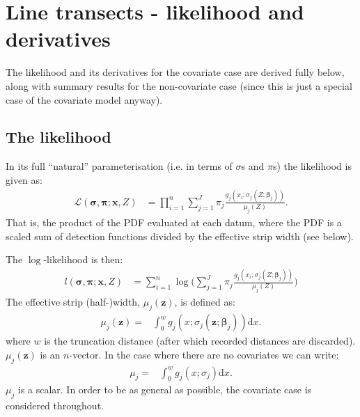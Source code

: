 \label{app-mixderivs}

\newcommand{\erf}{\text{Erf}}
\newcommand{\palphaj}{\frac{\partial}{\partial \alpha_{j*}}}
\newcommand{\pbetajk}{\frac{\partial}{\partial \beta_{j*k*}}}
\newcommand{\nuj}{\nu_j(\bm{z}^{(j)})}
\newcommand{\nujs}{\nu_{j*}(\bm{z}^{(j*)})}
\newcommand{\zijk}{z_{ik}^{(j)}}
\newcommand{\zijkss}{z_{ik*}^{(j*)}}
\newcommand{\zj}{\bm{z}_j}
\newcommand{\zjs}{\bm{z}_{j*}}
\newcommand{\zJ}{\bm{z}_J}

\section{Line transects - likelihood and derivatives}

The likelihood and its derivatives for the covariate case are derived fully below, along with summary results for the non-covariate case (since this is just a special case of the covariate model anyway).

\subsection{The likelihood}

In its full ``natural'' parameterisation (i.e. in terms of $\sigma$s and $\pi$s) the likelihood is given as:
\begin{align*}
\mathcal{L}(\bm{\sigma},\bm{\pi}; \bm{x}, Z) &= \prod_{i=1}^n \sum_{j=1}^J \pi_j \frac{g_j(x_i; \sigma_j(Z;\bm{\beta}_j))}{\mu_j(Z)}.
\end{align*}
That is, the product of the PDF evaluated at each datum, where the PDF is a scaled sum of detection functions divided by the effective strip width (see below). 

The $\log$-likelihood is then:
\begin{align*}
l(\bm{\sigma},\bm{\pi}; \bm{x}, Z) &= \sum_{i=1}^n \log\Big(\sum_{j=1}^J \pi_j \frac{g_j(x_i;\sigma_j(Z;\bm{\beta}_j))}{\mu_j(Z)}\Big)
\end{align*}
The effective strip (half-)width, $\mu_j(\bm{z})$, is defined as:
\begin{align*}
\mu_j(\bm{z})=& \int_0^w g_j(x;\sigma_j(\bm{z};\bm{\beta}_j)) \text{d}x.
\end{align*}
where $w$ is the truncation distance (after which recorded distances are discarded). $\mu_j(\bm{z})$ is an $n$-vector. In the case where there are no covariates we can write:
\begin{align*}
\mu_j=& \int_0^w g_j(x;\sigma_j) \text{d}x.
\end{align*}
$\mu_j$ is a scalar.
In order to be as general as possible, the covariate case is considered throughout.

